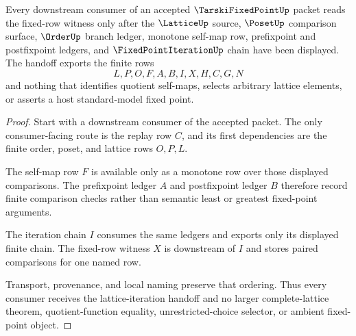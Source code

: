 \begin{theorem}
\label{thm:tarski-fixed-point-lattice-iteration-handoff}
Every downstream consumer of an accepted $\TarskiFixedPointUp$ packet reads the fixed-row witness only after the $\LatticeUp$ source, $\PosetUp$ comparison surface, $\OrderUp$ branch ledger, monotone self-map row, prefixpoint and postfixpoint ledgers, and $\FixedPointIterationUp$ chain have been displayed. The handoff exports the finite rows
$$
L,P,O,F,A,B,I,X,H,C,G,N
$$
and nothing that identifies quotient self-maps, selects arbitrary lattice elements, or asserts a host standard-model fixed point.
\end{theorem}
\begin{proof}
Start with a downstream consumer of the accepted packet. The only consumer-facing route is the replay row $C$, and its first dependencies are the finite order, poset, and lattice rows $O,P,L$.

The self-map row $F$ is available only as a monotone row over those displayed comparisons. The prefixpoint ledger $A$ and postfixpoint ledger $B$ therefore record finite comparison checks rather than semantic least or greatest fixed-point arguments.

The iteration chain $I$ consumes the same ledgers and exports only its displayed finite chain. The fixed-row witness $X$ is downstream of $I$ and stores paired comparisons for one named row.

Transport, provenance, and local naming preserve that ordering. Thus every consumer receives the lattice-iteration handoff and no larger complete-lattice theorem, quotient-function equality, unrestricted-choice selector, or ambient fixed-point object.
\end{proof}


